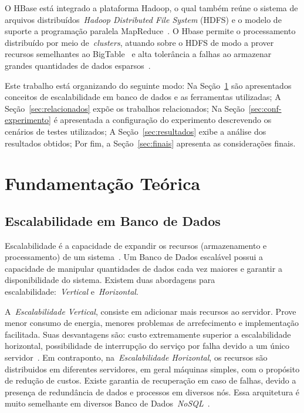 \documentclass[12pt]{article}
\begin{document}
O HBase está integrado a plataforma Hadoop, o qual também reúne o sistema de arquivos distribuídos~\emph{Hadoop Distributed File System} (HDFS) e o modelo de suporte a programação paralela MapReduce~\cite{hadoophbase}. O Hbase permite o processamento distribuído por meio de~\emph{clusters}, atuando sobre o HDFS de modo a prover recursos semelhantes ao BigTable~\cite{chang2008bigtable} e alta tolerância a falhas ao armazenar grandes quantidades de dados esparsos~\cite{hadoophbase}.

Este trabalho está organizando do seguinte modo: Na Seção~\ref{sec:fundamentacao} são apresentados conceitos de escalabilidade em banco de dados e as ferramentas utilizadas; A Seção~\ref{sec:relacionados} expõe os trabalhos relacionados; Na Seção~\ref{sec:conf-experimento} é apresentada a configuração do experimento descrevendo os cenários de testes utilizados; A Seção~\ref{sec:resultados} exibe a análise dos resultados obtidos; Por fim, a Seção~\ref{sec:finais} apresenta as considerações finais.

\section{Fundamentação Teórica}
\label{sec:fundamentacao}

\subsection{Escalabilidade em Banco de Dados}
\label{subsec:escalabilidade}

Escalabilidade é a capacidade de expandir os recursos (armazenamento e processamento) de um sistema~\cite{elmasri2010fundamentals}. Um Banco de Dados escalável possui a capacidade de manipular quantidades de dados cada vez maiores e garantir a disponibilidade do sistema. Existem duas abordagens para escalabilidade:~\emph{Vertical} e~\emph{Horizontal}.

A~\emph{Escalabilidade Vertical}, consiste em adicionar mais recursos ao servidor. Prove menor consumo de energia, menores problemas de arrefecimento e implementação facilitada. Suas desvantagens são: custo extremamente superior a escalabilidade horizontal, possibilidade de interrupção do serviço por falha devido a um único servidor~\cite{hwang2014scale}. Em contraponto, na~\emph{Escalabilidade Horizontal}, os recursos são distribuidos em diferentes servidores, em geral máquinas simples, com o propósito de redução de custos. Existe garantia de recuperação em caso de falhas, devido a presença de redundância de dados e processos em diversos nós. Essa arquitetura é muito semelhante em diversos Banco de Dados~\textit{NoSQL}~\cite{hwang2014scale}.
\end{document}
